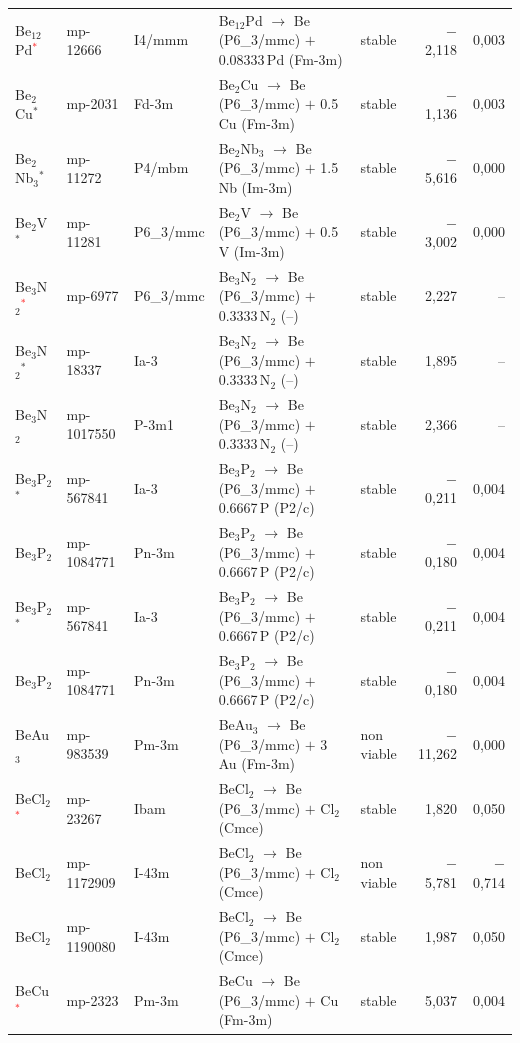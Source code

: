 \begin{longtable}{@{}ll l@{\hspace{4pt}} p{4.6cm} l@{\hspace{4pt}} rr@{}}
Be$_{12}$Pd\textcolor{red}{$^*$} & mp-12666 & I4/mmm & Be$_{12}$Pd $\to$ Be (P6\_3/mmc) $+$ 0.08333\,Pd (Fm-3m) & stable & $-$2{,}118 & 0{,}003 \\
Be$_{2}$Cu$^*$ & mp-2031 & Fd-3m & Be$_{2}$Cu $\to$ Be (P6\_3/mmc) $+$ 0.5\,Cu (Fm-3m) & stable & $-$1{,}136 & 0{,}003 \\
Be$_{2}$Nb$_{3}$$^*$ & mp-11272 & P4/mbm & Be$_{2}$Nb$_{3}$ $\to$ Be (P6\_3/mmc) $+$ 1.5\,Nb (Im-3m) & stable & $-$5{,}616 & 0{,}000 \\
Be$_{2}$V$^*$ & mp-11281 & P6\_3/mmc & Be$_{2}$V $\to$ Be (P6\_3/mmc) $+$ 0.5\,V (Im-3m) & stable & $-$3{,}002 & 0{,}000 \\
Be$_{3}$N$_{2}$\textcolor{red}{$^*$} & mp-6977 & P6\_3/mmc & Be$_{3}$N$_{2}$ $\to$ Be (P6\_3/mmc) $+$ 0.3333\,N$_{2}$ (--) & stable & 2{,}227 & -- \\
Be$_{3}$N$_{2}$$^*$ & mp-18337 & Ia-3 & Be$_{3}$N$_{2}$ $\to$ Be (P6\_3/mmc) $+$ 0.3333\,N$_{2}$ (--) & stable & 1{,}895 & -- \\
Be$_{3}$N$_{2}$ & mp-1017550 & P-3m1 & Be$_{3}$N$_{2}$ $\to$ Be (P6\_3/mmc) $+$ 0.3333\,N$_{2}$ (--) & stable & 2{,}366 & -- \\
Be$_{3}$P$_{2}$$^*$ & mp-567841 & Ia-3 & Be$_{3}$P$_{2}$ $\to$ Be (P6\_3/mmc) $+$ 0.6667\,P (P2/c) & stable & $-$0{,}211 & 0{,}004 \\
Be$_{3}$P$_{2}$ & mp-1084771 & Pn-3m & Be$_{3}$P$_{2}$ $\to$ Be (P6\_3/mmc) $+$ 0.6667\,P (P2/c) & stable & $-$0{,}180 & 0{,}004 \\
Be$_{3}$P$_{2}$$^*$ & mp-567841 & Ia-3 & Be$_{3}$P$_{2}$ $\to$ Be (P6\_3/mmc) $+$ 0.6667\,P (P2/c) & stable & $-$0{,}211 & 0{,}004 \\
Be$_{3}$P$_{2}$ & mp-1084771 & Pn-3m & Be$_{3}$P$_{2}$ $\to$ Be (P6\_3/mmc) $+$ 0.6667\,P (P2/c) & stable & $-$0{,}180 & 0{,}004 \\
BeAu$_{3}$ & mp-983539 & Pm-3m & BeAu$_{3}$ $\to$ Be (P6\_3/mmc) $+$ 3\,Au (Fm-3m) & non viable & $-$11{,}262 & 0{,}000 \\
BeCl$_{2}$\textcolor{red}{$^*$} & mp-23267 & Ibam & BeCl$_{2}$ $\to$ Be (P6\_3/mmc) $+$ Cl$_{2}$ (Cmce) & stable & 1{,}820 & 0{,}050 \\
BeCl$_{2}$ & mp-1172909 & I-43m & BeCl$_{2}$ $\to$ Be (P6\_3/mmc) $+$ Cl$_{2}$ (Cmce) & non viable & $-$5{,}781 & $-$0{,}714 \\
BeCl$_{2}$ & mp-1190080 & I-43m & BeCl$_{2}$ $\to$ Be (P6\_3/mmc) $+$ Cl$_{2}$ (Cmce) & stable & 1{,}987 & 0{,}050 \\
BeCu\textcolor{red}{$^*$} & mp-2323 & Pm-3m & BeCu $\to$ Be (P6\_3/mmc) $+$ Cu (Fm-3m) & stable & 5{,}037 & 0{,}004 \\

\end{longtable}
